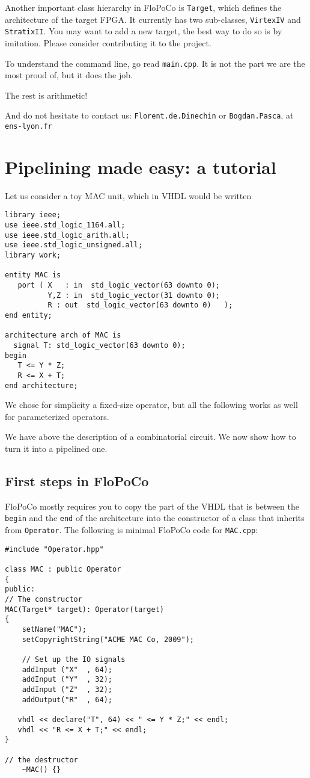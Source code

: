 \documentclass{article}
\begin{document}
Another important class hierarchy in FloPoCo is \texttt{Target}, which
defines the architecture of the target FPGA. It currently has two
sub-classes, \texttt{VirtexIV} and \texttt{StratixII}. You may want to
add a new target, the best way to do so is by imitation. Please
consider contributing it to the project.

To understand the command line, go read \texttt{main.cpp}. It is not
the part we are the most proud of, but it does the job.

The rest is arithmetic!

And do not hesitate to contact us: \texttt{Florent.de.Dinechin} or
\texttt{Bogdan.Pasca}, at \texttt{ens-lyon.fr}



\section{Pipelining made easy: a tutorial}
\label{sec:pme}

Let us consider a toy MAC unit, which in VHDL would be written
\begin{verbatim}
library ieee;
use ieee.std_logic_1164.all;
use ieee.std_logic_arith.all;
use ieee.std_logic_unsigned.all;
library work;

entity MAC is
   port ( X   : in  std_logic_vector(63 downto 0);
          Y,Z : in  std_logic_vector(31 downto 0);
          R : out  std_logic_vector(63 downto 0)   );
end entity;

architecture arch of MAC is
  signal T: std_logic_vector(63 downto 0);
begin
   T <= Y * Z;
   R <= X + T;
end architecture;
\end{verbatim}
We chose for simplicity a fixed-size operator, but all the following
works as well for parameterized operators.

We have above  the description of
a combinatorial circuit. We now show how to turn it into a pipelined
one.


\subsection{First steps in FloPoCo}

FloPoCo mostly requires you to copy the part of the VHDL that is
between the \texttt{begin} and the \texttt{end} of the architecture
into the constructor of a class that inherits from
\verb!Operator!. The following is minimal FloPoCo code for
\verb!MAC.cpp!:
\begin{verbatim}
#include "Operator.hpp"

class MAC : public Operator
{
public:
// The constructor
MAC(Target* target): Operator(target)
{
	setName("MAC");
	setCopyrightString("ACME MAC Co, 2009");		

	// Set up the IO signals
	addInput ("X"  , 64);
	addInput ("Y"  , 32);
	addInput ("Z"  , 32);
	addOutput("R"  , 64);

   vhdl << declare("T", 64) << " <= Y * Z;" << endl;
   vhdl << "R <= X + T;" << endl;
}

// the destructor
	~MAC() {}
\end{verbatim}
 
\end{document}
